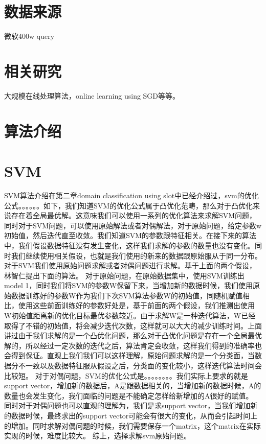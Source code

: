 \documentclass[master]{njuthesis}
\begin{document}
\section{数据来源}

微软400w query

\section{相关研究}

大规模在线处理算法，online learning using SGD等等。

\section{算法介绍}

\section{SVM}
SVM算法介绍在第二章domain classification using slot中已经介绍过，svm的优化公式。。。。。。如下，我们知道SVM的优化公式属于凸优化范畴，那么对于凸优化来说存在着全局最优解。这意味我们可以使用一系列的优化算法来求解SVM问题，同时对于SVM问题，可以使用原始解法或者对偶解法，对于原始问题，给定参数w初始值，然后迭代直至收敛。我们知道SVM的参数跟特征相关。在接下来的算法中，我们假设数据特征没有发生变化，这样我们求解的参数的数量也没有变化。同时我们继续使用相关假设，也就是我们使用的新来的数据跟原始服从于同一分布。
对于SVM我们使用原始问题求解或者对偶问题进行求解。基于上面的两个假设，林智仁提出下面的算法。
对于原始问题，在原始数据集中，使用SVM训练出model 1，同时我们将SVM的参数W保留下来，当增加新的数据时候，我们使用原始数据训练好的参数W作为我们下次SVM算法参数W的初始值，同随机赋值相比，使用这些前面训练好的参数好处是，基于前面的两个假设，我们推测出使用W初始值距离新的优化目标最优参数较近。由于求解W是一种迭代算法，W已经取得了不错的初始值，将会减少迭代次数，这样就可以大大的减少训练时间。上面讲过由于我们求解的是一个凸优化问题，那么对于凸优化问题是存在一个全局最优解的，所以经过一定次数的迭代之后，算法肯定会收敛，这样我们得到的准确率也会得到保证。直观上我们我们可以这样理解，原始问题求解的是一个分类面，当数据分不一致以及数据特征服从假设之后，分类面的变化较小，这样迭代算法时间会比较短。
对于对偶问题，SVM的优化公式是。。。。。。。。我们实际上要求的就是support vector，增加新的数据后，A是跟数据相关的，当增加新的数据时候，A的数量也会发生变化，我们面临的问题是不能确定怎样给新增加的A很好的赋值。
同时对于对偶问题也可以直观的理解为，我们是求support vector，当我们增加新的数据时候，最终求出的support vector可能会有很大的变化，从而会引起时间上的增加。同时求解对偶问题的时候，我们需要保存一个matrix，这个matrix在实际实现的时候，难度比较大。
综上，选择求解svm原始问题。
\end{document}

